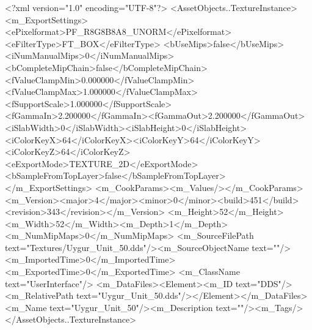 <?xml version="1.0" encoding="UTF-8"?>
<AssetObjects..TextureInstance>
  <m_ExportSettings>
    <ePixelformat>PF_R8G8B8A8_UNORM</ePixelformat><eFilterType>FT_BOX</eFilterType>
    <bUseMips>false</bUseMips><iNumManualMips>0</iNumManualMips><bCompleteMipChain>false</bCompleteMipChain>
    <fValueClampMin>0.000000</fValueClampMin><fValueClampMax>1.000000</fValueClampMax><fSupportScale>1.000000</fSupportScale>
    <fGammaIn>2.200000</fGammaIn><fGammaOut>2.200000</fGammaOut><iSlabWidth>0</iSlabWidth><iSlabHeight>0</iSlabHeight>
    <iColorKeyX>64</iColorKeyX><iColorKeyY>64</iColorKeyY><iColorKeyZ>64</iColorKeyZ>
    <eExportMode>TEXTURE_2D</eExportMode><bSampleFromTopLayer>false</bSampleFromTopLayer>
  </m_ExportSettings>
  <m_CookParams><m_Values/></m_CookParams>
  <m_Version><major>4</major><minor>0</minor><build>451</build><revision>343</revision></m_Version>
  <m_Height>52</m_Height><m_Width>52</m_Width><m_Depth>1</m_Depth><m_NumMipMaps>0</m_NumMipMaps>
  <m_SourceFilePath text="Textures/Uygur_Unit_50.dds"/><m_SourceObjectName text=""/>
  <m_ImportedTime>0</m_ImportedTime><m_ExportedTime>0</m_ExportedTime>
  <m_ClassName text="UserInterface"/>
  <m_DataFiles><Element><m_ID text="DDS"/><m_RelativePath text="Uygur_Unit_50.dds"/></Element></m_DataFiles>
  <m_Name text="Uygur_Unit_50"/><m_Description text=""/><m_Tags/>
</AssetObjects..TextureInstance>
